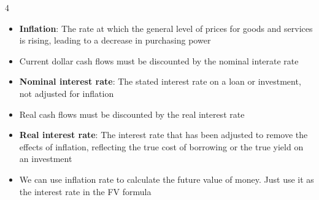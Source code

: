 \documentclass[10pt, landscape]{article}
\begin{document}
\begin{multicols*}{4}
    \begin{itemize}
      \item \textbf{Inflation}: The rate at which the general level of prices for goods and services is rising, leading to a decrease in purchasing power
      \item Current dollar cash flows must be discounted by the nominal interate rate
      \item \textbf{Nominal interest rate}: The stated interest rate on a loan or investment, not adjusted for inflation
      \item Real cash flows must be discounted by the real interest rate
      \item \textbf{Real interest rate}: The interest rate that has been adjusted to remove the effects of inflation, reflecting the true cost of borrowing or the true yield on an investment
      \item We can use inflation rate to calculate the future value of money. Just use it as the interest rate in the FV formula
    \end{itemize}


\end{multicols*}
\end{document}
